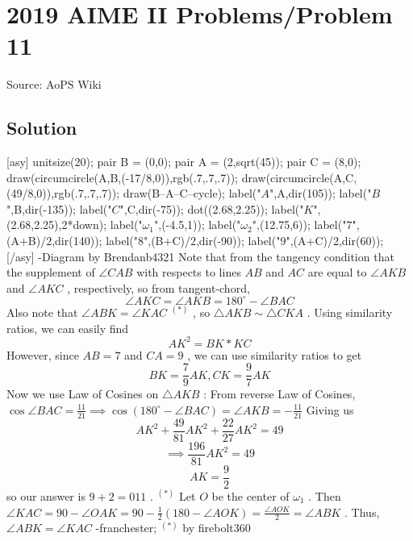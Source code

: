 \documentclass[12pt]{article}
\begin{document}
\section*{{2019 AIME II Problems/Problem 11}}
Source: AoPS Wiki

\subsection*{Solution}
[asy] unitsize(20); pair B = (0,0); pair A = (2,sqrt(45)); pair C = (8,0); draw(circumcircle(A,B,(-17/8,0)),rgb(.7,.7,.7)); draw(circumcircle(A,C,(49/8,0)),rgb(.7,.7,.7)); draw(B--A--C--cycle); label("$A$",A,dir(105)); label("$B$",B,dir(-135)); label("$C$",C,dir(-75)); dot((2.68,2.25)); label("$K$",(2.68,2.25),2*down); label("$\omega_1$",(-4.5,1)); label("$\omega_2$",(12.75,6)); label("$7$",(A+B)/2,dir(140)); label("$8$",(B+C)/2,dir(-90)); label("$9$",(A+C)/2,dir(60)); [/asy] -Diagram by Brendanb4321 Note that from the tangency condition that the supplement of $\angle CAB$ with respects to lines $AB$ and $AC$ are equal to $\angle AKB$ and $\angle AKC$ , respectively, so from tangent-chord, \[\angle AKC=\angle AKB=180^{\circ}-\angle BAC\] Also note that $\angle ABK=\angle KAC$ $^{(*)}$ , so $\triangle AKB\sim \triangle CKA$ . Using similarity ratios, we can easily find \[AK^2=BK*KC\] However, since $AB=7$ and $CA=9$ , we can use similarity ratios to get \[BK=\frac{7}{9}AK, CK=\frac{9}{7}AK\] Now we use Law of Cosines on $\triangle AKB$ : From reverse Law of Cosines, $\cos{\angle BAC}=\frac{11}{21}\implies \cos{(180^{\circ}-\angle BAC)}=\angle AKB=-\frac{11}{21}$ Giving us \[AK^2+\frac{49}{81}AK^2+\frac{22}{27}AK^2=49\] \[\implies \frac{196}{81}AK^2=49\] \[AK=\frac{9}{2}\] so our answer is $9+2=\boxed{011}$ . $^{(*)}$ Let $O$ be the center of $\omega_1$ . Then $\angle KAC = 90 - \angle OAK = 90 - \frac{1}{2}(180 - \angle AOK) = \frac{\angle AOK}{2} = \angle ABK$ . Thus, $\angle ABK = \angle KAC$ -franchester; $^{(*)}$ by firebolt360
\end{document}

